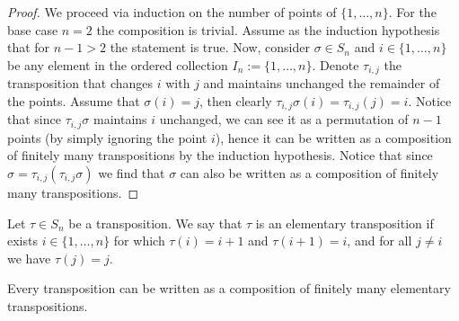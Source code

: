 \begin{proof}
  We proceed via induction on the number of points of \(\{1, \dots, n\}\). For
  the base case \(n = 2\) the composition is trivial. Assume as the induction
  hypothesis that for \(n - 1 > 2\) the statement is true. Now, consider
  \(\sigma \in S_n\) and \(i \in \{1, \dots, n\}\) be any element in
  the ordered collection \(I_n := \{1, \dots, n\}\). Denote \(\tau_{i, j}\) the
  transposition that changes \(i\) with \(j\) and maintains unchanged the
  remainder of the points. Assume that \(\sigma(i) = j\), then clearly
  \(\tau_{i, j} \sigma(i) = \tau_{i, j}(j) = i\). Notice that since \(\tau_{i,
  j} \sigma\) maintains \(i\) unchanged, we can see it as a permutation of \(n
  - 1\) points (by simply ignoring the point \(i\)), hence it can be written as
  a composition of finitely many transpositions by the induction hypothesis.
  Notice that since \(\sigma = \tau_{i, j} (\tau_{i, j} \sigma)\) we find that
  \(\sigma\) can also be written as a composition of finitely many
  transpositions.
\end{proof}

\begin{definition}
  Let \(\tau \in S_n\) be a transposition. We say that \(\tau\) is an
  elementary transposition if exists \(i \in \{1, \dots, n\}\) for which
  \(\tau(i) = i + 1\) and \(\tau(i + 1) = i\), and for all \(j \neq i\) we have
  \(\tau(j) = j\).
\end{definition}

\begin{proposition}
  Every transposition can be written as a composition of finitely many
  elementary transpositions.
\end{proposition}

